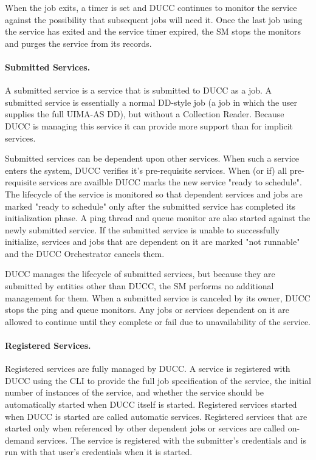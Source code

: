      When the job exits, a timer is set and DUCC continues to monitor the service against the
      possibility that subsequent jobs will need it. Once the last job using the service has exited
      and the service timer expired, the SM stops the monitors and purges the service from its
      records.
      
      \paragraph{Submitted Services.} A submitted service is a service that is submitted to DUCC as a job. A
      submitted service is essentially a normal DD-style job (a job in which the user supplies the
      full UIMA-AS DD), but without a Collection Reader. Because DUCC is managing this service it can
      provide more support than for implicit services.
      
      Submitted services can be dependent upon other services. When such a service enters the system,
      DUCC verifies it's pre-requisite services. When (or if) all pre-requisite services are availble
      DUCC marks the new service "ready to schedule". The lifecycle of the service is monitored so
      that dependent services and jobs are marked "ready to schedule" only after the submitted service
      has completed its initialization phase. A ping thread and queue monitor are also started against
      the newly submitted service. If the submitted service is unable to successfully initialize,
      services and jobs that are dependent on it are marked "not runnable" and the DUCC Orchestrator
      cancels them.
      
      DUCC manages the lifecycle of submitted services, but because they are submitted by entities
      other than DUCC, the SM performs no additional management for them. When a submitted service is
      canceled by its owner, DUCC stops the ping and queue monitors. Any jobs or services dependent on
      it are allowed to continue until they complete or fail due to unavailability of the service.
      
      \paragraph{Registered Services.} Registered services are fully managed by DUCC. A service is
      registered with DUCC using the CLI to provide the full job specification of the service, the
      initial number of instances of the service, and whether the service should be automatically
      started when DUCC itself is started. Registered services started when DUCC is started are
      called automatic services.  Registered services that are started only when referenced by other
      dependent jobs or services are called on-demand services. The service is registered with the
      submitter's credentials and is run with that user's credentials when it is started.

